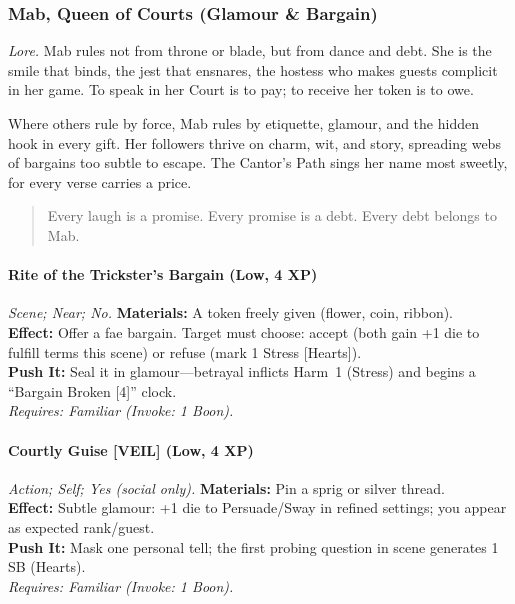 
\subsubsection{Mab, Queen of Courts (Glamour \& Bargain)}
\textit{Lore.} Mab rules not from throne or blade, but from dance and debt. She is the smile that binds, the jest that ensnares, the hostess who makes guests complicit in her game. To speak in her Court is to pay; to receive her token is to owe.  

Where others rule by force, Mab rules by etiquette, glamour, and the hidden hook in every gift. Her followers thrive on charm, wit, and story, spreading webs of bargains too subtle to escape. The Cantor’s Path sings her name most sweetly, for every verse carries a price.  

\begin{quote}
Every laugh is a promise. Every promise is a debt. Every debt belongs to Mab.  
\end{quote}


\paragraph*{Rite of the Trickster’s Bargain (Low, 4 XP)} \emph{Scene; Near; No.}  
\textbf{Materials:} A token freely given (flower, coin, ribbon).\\
\textbf{Effect:} Offer a fae bargain. Target must choose: accept (both gain +1 die to fulfill terms this scene) or refuse (mark 1 Stress [Hearts]).\\
\textbf{Push It:} Seal it in glamour—betrayal inflicts Harm~1 (Stress) and begins a “Bargain Broken [4]” clock.\\
\emph{Requires: Familiar (\textit{Invoke:} 1 Boon).}

\paragraph*{Courtly Guise \textnormal{[VEIL]} (Low, 4 XP)} \emph{Action; Self; Yes (social only).}  
\textbf{Materials:} Pin a sprig or silver thread.\\
\textbf{Effect:} Subtle glamour: +1 die to Persuade/Sway in refined settings; you appear as expected rank/guest.\\
\textbf{Push It:} Mask one personal tell; the first probing question in scene generates 1 SB (Hearts).\\
\emph{Requires: Familiar (\textit{Invoke:} 1 Boon).}

